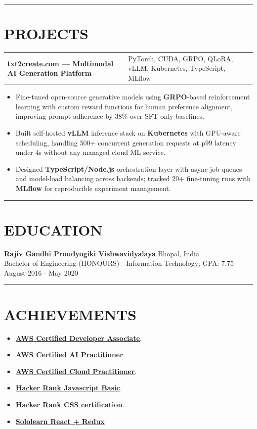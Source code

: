 \documentclass[100pt,a4paper]{article}
\newcommand{\sectionline}{
\begin{center}
\vspace{-10pt}
\rule{1\textwidth}{0.5pt}
\end{center}
\vspace{1pt}
}
\begin{document}
\sectionline
\section*{PROJECTS}
\begin{tabularx}{\textwidth}{@{} X >{\raggedleft\arraybackslash}p{8cm} @{}}
\textbf{txt2create.com — Multimodal AI Generation Platform} & 
\small PyTorch, CUDA, GRPO, QLoRA, vLLM, Kubernetes, TypeScript, MLflow
\end{tabularx}
\begin{itemize}
\vspace{4pt}
\item {Fine-tuned open-source generative models using \textbf{GRPO}-based reinforcement learning with custom reward functions for human preference alignment, improving prompt-adherence by 38\% over SFT-only baselines.}
\item {Built self-hosted \textbf{vLLM} inference stack on \textbf{Kubernetes} with GPU-aware scheduling, handling 500+ concurrent generation requests at p99 latency under 4s without any managed cloud ML service.}
\item {Designed \textbf{TypeScript/Node.js} orchestration layer with async job queues and model-load balancing across backends; tracked 20+ fine-tuning runs with \textbf{MLflow} for reproducible experiment management.}
\end{itemize}

\sectionline
\section*{EDUCATION}
\textbf{Rajiv Gandhi Proudyogiki Vishwavidyalaya} \hfill Bhopal, India \\[2pt]
Bachelor of Engineering (HONOURS) - Information Technology; GPA: 7.75 
\hfill August 2016 - May 2020

\sectionline
\section*{ACHIEVEMENTS}
\begin{itemize}
\item \href{https://www.credly.com/earner/earned/share/b3cbb0c0-3e79-44e8-9014-0f037b0dc12c} {\bf AWS Certified Developer Associate}.
\item \href{https://www.credly.com/badges/ed0f0afe-4927-4488-86b0-3956fb83e37c/linked_in_profile}{\bf AWS Certified AI Practitioner}.
\item \href{https://www.credly.com/badges/50f28d0d-2647-4f37-b78e-6bf5ce002d4e/linked_in_profile}{\bf AWS Certified Cloud Practitioner}.
\item \href{https://www.hackerrank.com/certificates/e8c2450c7b38/}{\bf Hacker Rank Javascript Basic}.
\item \href{https://www.hackerrank.com/certificates/3348c7124f7d} {\bf Hacker Rank CSS certification}.
\item \href{https://www.sololearn.com/en/certificates/CT-KRZNT5XO} {\bf Sololearn React + Redux}
\end{itemize}
\end{document}
